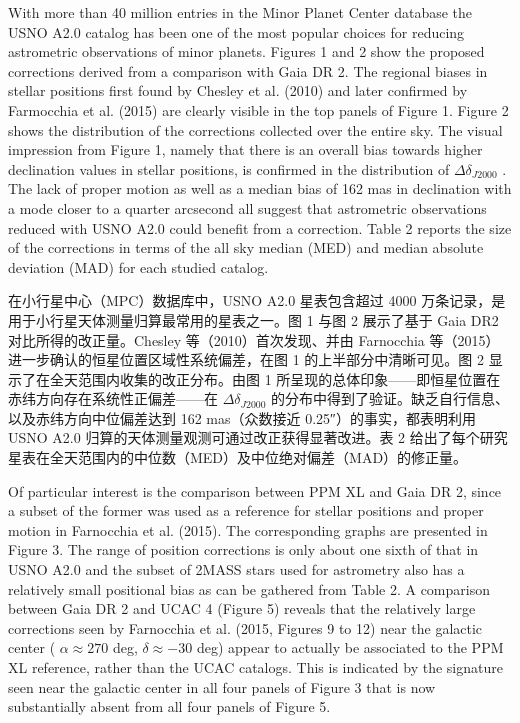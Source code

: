 With more than 40 million entries in the Minor Planet Center database the USNO A2.0 catalog has been one of the most popular choices for reducing astrometric observations of minor planets. Figures 1 and 2 show the proposed corrections derived from a comparison with Gaia DR 2. The regional biases in stellar positions first found by Chesley et al. (2010) and later confirmed by Farmocchia et al. (2015) are clearly visible in the top panels of Figure 1. Figure 2 shows the distribution of the corrections collected over the entire sky. The visual impression from Figure 1, namely that there is an overall bias towards higher declination values in stellar positions, is confirmed in the distribution of  $\Delta \delta_{J2000}$ . The lack of proper motion as well as a median bias of 162 mas in declination with a mode closer to a quarter arcsecond all suggest that astrometric observations reduced with USNO A2.0 could benefit from a correction. Table 2 reports the size of the corrections in terms of the all sky median (MED) and median absolute deviation (MAD) for each studied catalog. 

在小行星中心（MPC）数据库中，USNO A2.0 星表包含超过 4000 万条记录，是用于小行星天体测量归算最常用的星表之一。图 1 与图 2 展示了基于 Gaia DR2 对比所得的改正量。Chesley 等（2010）首次发现、并由 Farnocchia 等（2015）进一步确认的恒星位置区域性系统偏差，在图 1 的上半部分中清晰可见。图 2 显示了在全天范围内收集的改正分布。由图 1 所呈现的总体印象——即恒星位置在赤纬方向存在系统性正偏差——在 $\Delta \delta_{J2000}$ 的分布中得到了验证。缺乏自行信息、以及赤纬方向中位偏差达到 162 mas（众数接近 0.25″）的事实，都表明利用 USNO A2.0 归算的天体测量观测可通过改正获得显著改进。表 2 给出了每个研究星表在全天范围内的中位数（MED）及中位绝对偏差（MAD）的修正量。

Of particular interest is the comparison between PPM XL and Gaia DR 2, since a subset of the former was used as a reference for stellar positions and proper motion in Farnocchia et al. (2015). The corresponding graphs are presented in Figure 3. The range of position corrections is only about one sixth of that in USNO A2.0 and the subset of 2MASS stars used for astrometry also has a relatively small positional bias as can be gathered from Table 2. A comparison between Gaia DR 2 and UCAC 4 (Figure 5) reveals that the relatively large corrections seen by Farnocchia et al. (2015, Figures 9 to 12) near the galactic center ( $\alpha \approx 270$  deg,  $\delta \approx - 30$  deg) appear to actually be associated to the PPM XL reference, rather than the UCAC catalogs. This is indicated by the signature seen near the galactic center in all four panels of Figure 3 that is now substantially absent from all four panels of Figure 5.

